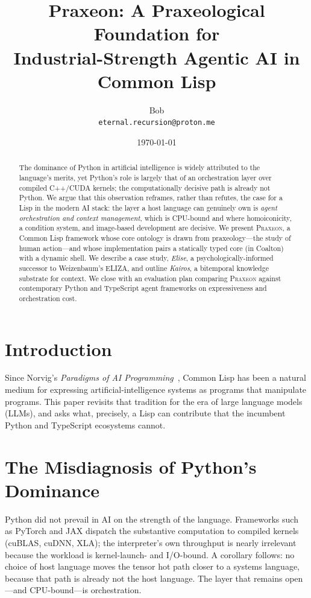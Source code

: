 \documentclass[11pt,a4paper]{article}
\title{\textbf{Praxeon}: A Praxeological Foundation for\\
       Industrial-Strength Agentic AI in Common Lisp}
\author{Bob\\ \small\texttt{eternal.recursion@proton.me}}
\date{\today}
\begin{document}
\maketitle

\begin{abstract}
The dominance of Python in artificial intelligence is widely attributed to the
language's merits, yet Python's role is largely that of an orchestration layer
over compiled C++/CUDA kernels; the computationally decisive path is already not
Python. We argue that this observation reframes, rather than refutes, the case
for a Lisp in the modern AI stack: the layer a host language can genuinely own is
\emph{agent orchestration and context management}, which is CPU-bound and where
homoiconicity, a condition system, and image-based development are decisive. We
present \textsc{Praxeon}, a Common Lisp framework whose core ontology is drawn
from praxeology---the study of human action---and whose implementation pairs a
statically typed core (in Coalton) with a dynamic shell. We describe a case
study, \emph{Elise}, a psychologically-informed successor to Weizenbaum's ELIZA,
and outline \emph{Kairos}, a bitemporal knowledge substrate for context. We
close with an evaluation plan comparing \textsc{Praxeon} against contemporary
Python and TypeScript agent frameworks on expressiveness and orchestration cost.
\end{abstract}

\section{Introduction}
\label{sec:intro}
Since Norvig's \emph{Paradigms of AI Programming}~\citep{norvig1992paip}, Common
Lisp has been a natural medium for expressing artificial-intelligence systems as
programs that manipulate programs. This paper revisits that tradition for the era
of large language models (LLMs), and asks what, precisely, a Lisp can contribute
that the incumbent Python and TypeScript ecosystems cannot.

\section{The Misdiagnosis of Python's Dominance}
\label{sec:misdiagnosis}
Python did not prevail in AI on the strength of the language. Frameworks such as
PyTorch and JAX dispatch the substantive computation to compiled kernels
(cuBLAS, cuDNN, XLA); the interpreter's own throughput is nearly irrelevant
because the workload is kernel-launch- and I/O-bound. A corollary follows: no
choice of host language moves the tensor hot path closer to a systems language,
because that path is already not the host language. The layer that remains
open---and CPU-bound---is orchestration.
\end{document}
